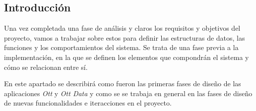 \subsection{Introducción}
\label{subsec:Analisis_introduccion}

Una vez completada una fase de análisis y claros los requisitos y objetivos del proyecto, vamos a trabajar sobre 
estos para definir las estructuras de datos, las funciones y los comportamientos del sistema. Se trata de una
fase previa a la implementación, en la que se definen los elementos que compondrán el sistema y cómo se relacionan
entre sí. 

En este apartado se describirá como fueron las primeras fases de diseño de las aplicaciones \textit{Ott} y \textit{Ott Data} 
y como se se trabaja en general en las fases de diseño de nuevas funcionalidades e iteracciones en el proyecto.

